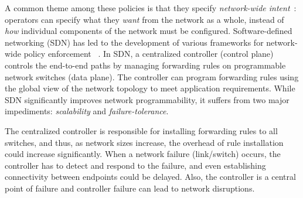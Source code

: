 
A common theme among these policies is that they specify
\emph{network-wide intent}~\cite{intent}: operators can specify what
they \emph{want} from the network as a whole, instead of \emph{how}
individual components of the network must be configured.
Software-defined networking (SDN) has led to the development of
various frameworks for network-wide policy enforcement ~\cite{netkat,
  simple, merlin, fattire, genesis}. In SDN, a centralized controller
(control plane) controls the end-to-end paths by managing forwarding
rules on programmable network switches (data plane). The controller
can program forwarding rules using the global view of the network
topology to meet application requirements. While SDN significantly
improves network programmability, it suffers from two major
impediments: \emph{scalability} and \emph{failure-tolerance}.

The centralized controller is responsible for installing 
forwarding rules to all switches, and thus, as network sizes
increase, the overhead of rule installation could increase
significantly. When a network failure (link/switch) occurs,
the controller has to detect and respond to the failure, and
even establishing connectivity between endpoints could be delayed.
Also, the controller is a central point of failure and controller
failure can lead to network disruptions. 

